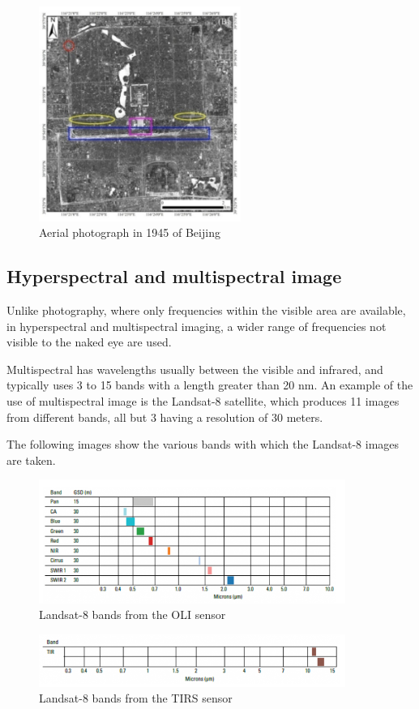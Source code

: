 \begin{figure}[h]
\centering
\includegraphics[height=7cm]{images/foto.png}
\caption{Aerial photograph in 1945 of Beijing \cite{asmr}}
\end{figure}

\subsection{Hyperspectral and multispectral image}
Unlike photography, where only frequencies within the visible area are available, in hyperspectral and multispectral imaging, a wider range of frequencies not visible to the naked eye are used.


Multispectral has wavelengths usually between the visible and infrared, and typically uses 3 to 15 bands with a length greater than 20 nm. An example of the use of multispectral image is the Landsat-8 satellite, which produces 11 images from different bands, all but 3 having a resolution of 30 meters.

The following images show the various bands with which the Landsat-8 images are taken.

\begin{figure}[H]
\centering
\includegraphics[width=10cm]{images/landsat1.png}
\caption{Landsat-8 bands from the OLI sensor}
\end{figure}

\begin{figure}[H]
\centering
\includegraphics[width=10cm]{images/landsat2.png}
\caption{Landsat-8 bands from the TIRS sensor}
\end{figure}

